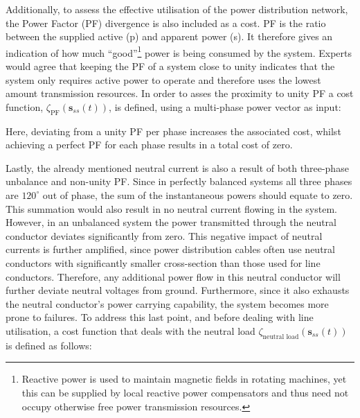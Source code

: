 Additionally, to assess the effective utilisation of the power distribution network, the Power Factor (PF) divergence is also included as a cost.
PF is the ratio between the supplied active (p) and apparent power (s).
It therefore gives an indication of how much ``good''\footnote[1]{Reactive power is used to maintain magnetic fields in rotating machines, yet this can be supplied by local reactive power compensators and thus need not occupy otherwise free power transmission resources.} power is being consumed by the system.
Experts would agree that keeping the PF of a system close to unity indicates that the system only requires active power to operate and therefore uses the lowest amount transmission resources.
In order to asses the proximity to unity PF a cost function, $\zeta_\text{PF}(\textbf{s}_{ss}(t))$, is defined, using a multi-phase power vector as input:



Here, deviating from a unity PF per phase increases the associated cost, whilst achieving a perfect PF for each phase results in a total cost of zero.


Lastly, the already mentioned neutral current is also a result of both three-phase unbalance and non-unity PF.
Since in perfectly balanced systems all three phases are $120^\circ$ out of phase, the sum of the instantaneous powers should equate to zero.
This summation would also result in no neutral current flowing in the system.
However, in an unbalanced system the power transmitted through the neutral conductor deviates significantly from zero.
This negative impact of neutral currents is further amplified, since power distribution cables often use neutral conductors with significantly smaller cross-section than those used for line conductors.
Therefore, any additional power flow in this neutral conductor will further deviate neutral voltages from ground.
Furthermore, since it also exhausts the neutral conductor's power carrying capability, the system becomes more prone to failures.
To address this last point, and before dealing with line utilisation, a cost function that deals with the neutral load $\zeta_\text{neutral load}(\textbf{s}_{ss}(t))$ is defined as follows:



